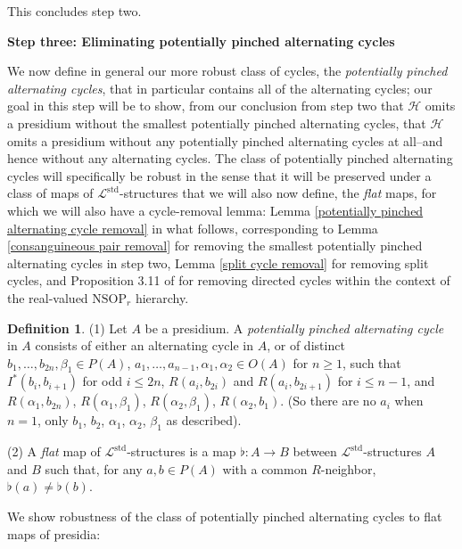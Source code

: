 \documentclass{amsart}
\theoremstyle{definition}
\newtheorem{definition}[theorem]{Definition}
\theoremstyle{remark}
\numberwithin{equation}{section}
\begin{document}
This concludes step two.

\:

\textbf{Step three: Eliminating potentially pinched alternating cycles}

We now define in general our more robust class of cycles, the \textit{potentially pinched alternating cycles}, that in particular contains all of the alternating cycles; our goal in this step will be to show, from our conclusion from step two that $\mathcal{H}$ omits a presidium without the smallest potentially pinched alternating cycles, that $\mathcal{H}$ omits a presidium without any potentially pinched alternating cycles at all--and hence without any alternating cycles. The class of potentially pinched alternating cycles will specifically be robust in the sense that it will be preserved under a class of maps of $\mathcal{L}^{\mathrm{std}}$-structures that we will also now define, the \textit{flat} maps, for which we will also have a cycle-removal lemma: Lemma \ref{potentially pinched alternating cycle removal} in what follows, corresponding to Lemma \ref{consanguineous pair removal} for removing the smallest potentially pinched alternating cycles in step two, Lemma \ref{split cycle removal} for removing split cycles, and Proposition 3.11 of \cite{ApproxOrder} for removing directed cycles within the context of the real-valued $\mathrm{NSOP}_{r}$ hierarchy.


\begin{definition}
   \label{potentially pinched alternating cycle, flat} (1) Let $A$ be a presidium. A \textit{potentially pinched alternating cycle} in $A$ consists of either an alternating cycle in $A$, or of distinct $b_{1}, \ldots, b_{2n}, \beta_1 \in P(A)$, $a_1, \ldots, a_{n-1}, \alpha_1, \alpha_2 \in O(A)$ for $n \geq 1$, such that  $I^{*}(b_i, b_{i+1} )$ for odd $i \leq 2n$, $R(a_i, b_{2i})$ and $R(a_i, b_{2i+1})$ for $i \leq n-1$, and $R(\alpha_{1}, b_{2n})$, $R(\alpha_1, \beta_1)$, $R(\alpha_2, \beta_1)$, $R(\alpha_2, b_1)$. (So there are no $a_i$ when $n = 1$, only $b_1$, $b_2$, $\alpha_1$, $\alpha_2$, $\beta_1$ as described).

   (2) A \textit{flat} map of $\mathcal{L}^{\mathrm{std}}$-structures is a map $\flat: A \to B$ between $\mathcal{L}^{\mathrm{std}}$-structures $A$ and $B$ such that, for any $a, b \in P(A)$ with a common $R$-neighbor, $\flat(a) \neq \flat(b)$.
\end{definition}

We show robustness of the class of potentially pinched alternating cycles to flat maps of presidia:
\end{document}
